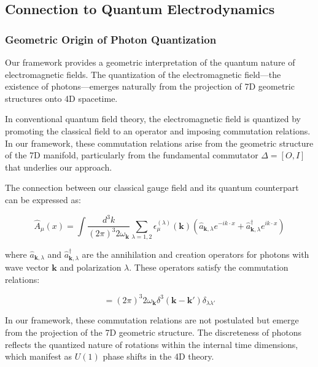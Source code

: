 \documentclass{article}
\begin{document}
\subsection{Connection to Quantum Electrodynamics}

\subsubsection{Geometric Origin of Photon Quantization}

Our framework provides a geometric interpretation of the quantum nature of electromagnetic fields. The quantization of the electromagnetic field—the existence of photons—emerges naturally from the projection of 7D geometric structures onto 4D spacetime.

In conventional quantum field theory, the electromagnetic field is quantized by promoting the classical field to an operator and imposing commutation relations. In our framework, these commutation relations arise from the geometric structure of the 7D manifold, particularly from the fundamental commutator $\Delta = [O, I]$ that underlies our approach.

The connection between our classical gauge field and its quantum counterpart can be expressed as:

\begin{equation}
\hat{A}_{\mu}(x) = \int \frac{d^3k}{(2\pi)^3 2\omega_{\mathbf{k}}} \sum_{\lambda=1,2} \epsilon_{\mu}^{(\lambda)}(\mathbf{k}) \left( \hat{a}_{\mathbf{k},\lambda} e^{-ik \cdot x} + \hat{a}^{\dagger}_{\mathbf{k},\lambda} e^{ik \cdot x} \right)
\end{equation}

where $\hat{a}_{\mathbf{k},\lambda}$ and $\hat{a}^{\dagger}_{\mathbf{k},\lambda}$ are the annihilation and creation operators for photons with wave vector $\mathbf{k}$ and polarization $\lambda$. These operators satisfy the commutation relations:

\begin{equation}
[\hat{a}_{\mathbf{k},\lambda}, \hat{a}^{\dagger}_{\mathbf{k}',\lambda'}] = (2\pi)^3 2\omega_{\mathbf{k}} \delta^3(\mathbf{k} - \mathbf{k}') \delta_{\lambda\lambda'}
\end{equation}

In our framework, these commutation relations are not postulated but emerge from the projection of the 7D geometric structure. The discreteness of photons reflects the quantized nature of rotations within the internal time dimensions, which manifest as $U(1)$ phase shifts in the 4D theory.
\end{document}
